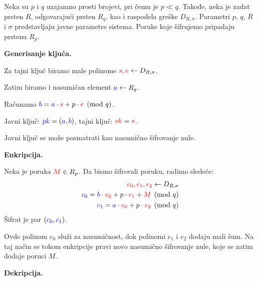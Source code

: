 Neka su $p$ i $q$ uzajamno prosti brojevi, pri čemu je $p \ll q$.
Takođe, neka je zadat prsten $R$, odgovarajući prsten $R_q$, kao i raspodela greške $D_{R,\sigma}$.
Parametri $p$, $q$, $R$ i $\sigma$ predstavljaju javne parametre sistema.
Poruke koje šifrujemo pripadaju prstenu $R_p$.

\noindent\textbf{Generisanje ključa.}

Za tajni ključ biramo male polinome $ {\color{red}s}, {\color{red}e} \leftarrow D_{R,\sigma}$.

Zatim biramo i nasumičan element $ {\color{blue}a} \leftarrow R_q $.

Računamo $ {\color{blue}b} = {\color{blue}a} \cdot {\color{red}s} + p \cdot {\color{red}e} \pmod q $.

Javni ključ: $ {\color{blue}pk} = ({\color{blue}a},{\color{blue}b}) $, tajni ključ: $ {\color{red}sk} = {\color{red}s} $.

Javni ključ se može posmatrati kao nasumično šifrovanje nule.

\noindent\textbf{Enkripcija.}

Neka je poruka $ {\color{red}M} \in R_p $.
Da bismo šifrovali poruku, radimo sledeće:
\[
\begin{aligned}
    {\color{red}e_0},{\color{red}e_1},{\color{red}e_2} \leftarrow D_{R,\sigma} \\
    {\color{blue}c_0} = {\color{blue}b} \cdot {\color{red}e_0} + p \cdot {\color{red}e_1} + {\color{red}M} \pmod q \\
    {\color{blue}c_1} = {\color{blue}a} \cdot {\color{red}e_0} + p \cdot {\color{red}e_2} \pmod q
\end{aligned}
    \]
Šifrat je par $ ({\color{blue}c_0},{\color{blue}c_1}) $.

Ovde polinom $e_0$ služi za nasumičnost, dok polinomi $e_1$ i $e_2$ dodaju mali
šum. Na taj način se tokom enkripcije pravi novo nasumično šifrovanje nule, koje
se zatim dodaje poruci $M$.

\noindent\textbf{Dekripcija.}

